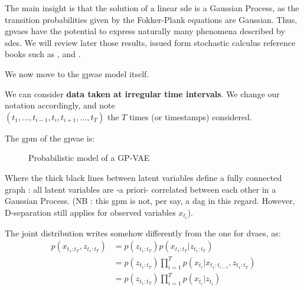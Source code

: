 The main insight is that the solution of a linear \gls{sde} is a Gaussian Process, as the transition probabilities given by the Fokker-Plank equations are Gaussian.
Thus, \glspl{gpvae} have the potential to express naturally many phenomena described by \glspl{sde}. 
We will review later those results, issued form stochastic calculus reference books such as \cite{mouvement-brownien-calcul-ito}, \cite{sarkka_applied_2019} and \cite{cours-jf-legall}. 

We now move to the \gls{gpvae} model itself.

We can consider \textbf{data taken at irregular time intervals}. We change our notation accordingly, and note \\
$(t_1, ..., t_{i-1}, t_i, t_{i+1}, ..., t_T)$ the $T$ times (or timestamps) considered. 

The \gls{gpm} of the \gls{gpvae} is:

\begin{figure}[H]
    \centering
    \label{fig:graphical_model_gpvae}
\caption{Probabilistic model of a GP-VAE}
\end{figure}

Where the thick black lines between latent variables define a fully connected graph : all latent variables are -a priori- correlated between each other in a Gaussian Process. (NB : this \gls{gpm} is not, per say, a \gls{dag} in this regard. However, D-separation still applies for observed variables $x_{t_i}$).

The joint distribution writes somehow differently from the one for \glspl{dvae}, as:
\begin{align}
\label{joint_gpvae}
    p(x_{t_1:t_T}, z_{t_1:t_T}) &= p(z_{t_1:t_T}) p(x_{t_1:t_T} \vert z_{t_1:t_T}) \\
    &= p(z_{t_1:t_T}) \prod_{i=1}^T p(x_{t_i} \vert x_{t_1:t_{i-1}}, z_{t_1:t_T}) \\
    &= p(z_{t_1:t_T}) \prod_{i=1}^T p(x_{t_i} \vert z_{t_{i}})
\end{align}


